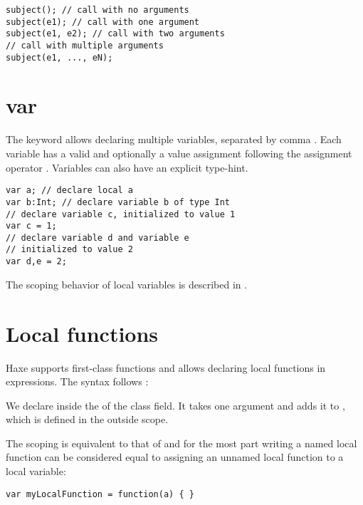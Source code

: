 \begin{lstlisting}
subject(); // call with no arguments
subject(e1); // call with one argument
subject(e1, e2); // call with two arguments
// call with multiple arguments
subject(e1, ..., eN);
\end{lstlisting}


\section{var}
\label{expression-var}

The  keyword allows declaring multiple variables, separated by comma \expr{,}. Each variable has a valid  and optionally a value assignment following the assignment operator \expr{=}. Variables can also have an explicit type-hint.

\begin{lstlisting}
var a; // declare local a
var b:Int; // declare variable b of type Int
// declare variable c, initialized to value 1
var c = 1;
// declare variable d and variable e
// initialized to value 2
var d,e = 2;
\end{lstlisting}

The scoping behavior of local variables is described in .


\section{Local functions}
\label{expression-function}

Haxe supports first-class functions and allows declaring local functions in expressions. The syntax follows :


We declare  inside the  of the  class field. It takes one argument  and adds it to , which is defined in the outside scope.

The scoping is equivalent to that of  and for the most part writing a named local function can be considered equal to assigning an unnamed local function to a local variable:

\begin{lstlisting}
var myLocalFunction = function(a) { }
\end{lstlisting}

